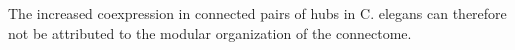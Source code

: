 \documentclass[10pt,letterpaper]{article}
\begin{document}
The increased coexpression in connected pairs of hubs in C. elegans can therefore not be attributed to the modular organization of the connectome.

\end{document}
